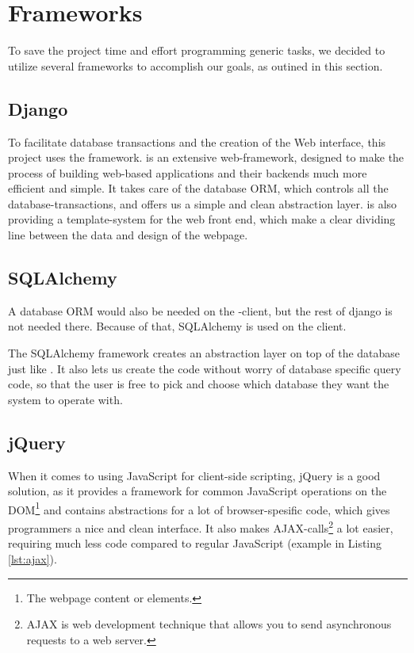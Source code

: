 \section{Frameworks}
\label{sec:frameworks}
To save the project time and effort programming generic tasks, we decided to
utilize several frameworks to accomplish our goals, as outined in this section.

\subsection{Django}
To facilitate database transactions and the creation of the Web interface, this
project uses the \django{} \cite{django} framework.
\django{} is an extensive web-framework, designed to make the process of
building web-based applications and their backends much more efficient and
simple. It takes care of the database ORM, which controls all the
database-transactions, and offers us a simple and clean abstraction layer.
\django{} is also providing a template-system for the web front end, which make
a clear dividing line between the data and design of the webpage.

\subsection{SQLAlchemy}
A database ORM would also be needed on the \snowman-client, but the rest of
django is not needed there. Because of that, SQLAlchemy is used on the client.

The SQLAlchemy framework creates an abstraction layer on top of the database
just like \django{}. It also lets us create the code without worry of database
specific query code, so that the user is free to pick and choose which database
they want the system to operate with.

\subsection{jQuery}
When it comes to using JavaScript for client-side scripting, jQuery
\cite{jquery} is a good solution, as it provides a framework for common
JavaScript operations on the DOM\footnote{The webpage content or elements.} and
contains abstractions for a lot of browser-spesific code, which gives
programmers a nice and clean interface. It also makes AJAX-calls\footnote{AJAX
is web development technique that allows you to send asynchronous requests to a
web server.} a lot easier, requiring much less code compared to regular
JavaScript (example in Listing \ref{lst:ajax}).

